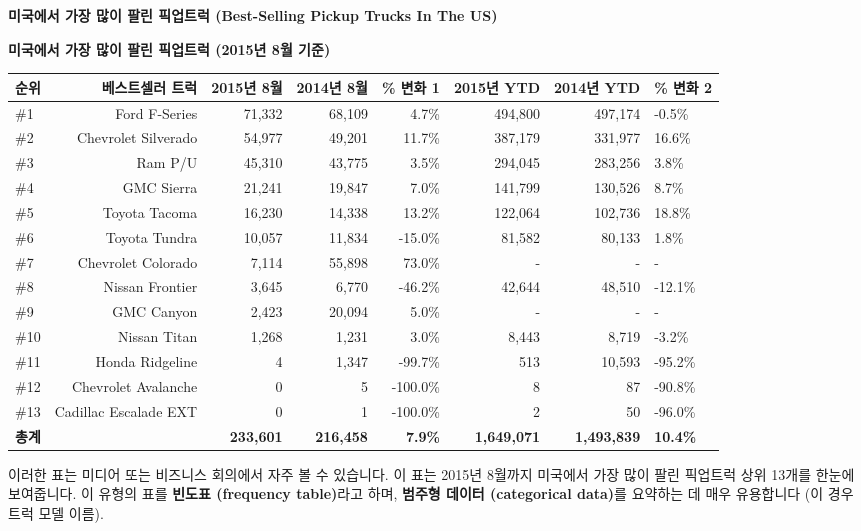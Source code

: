 \documentclass[11pt,a4paper]{book}
\providecommand{\captionof}[2]{\textbf{#2}}
\theoremstyle{definition}
\begin{document}
\begin{examplebox}
\textbf{미국에서 가장 많이 팔린 픽업트럭 (Best-Selling Pickup Trucks In The US)}

\begin{center}
\captionof{table}{미국에서 가장 많이 팔린 픽업트럭 (2015년 8월 기준)}
\label{tab:pickup_trucks}
\begin{adjustbox}{width=\textwidth, center}
\begin{tabular}{lrrrrrr}
\toprule
\textbf{순위} & \textbf{베스트셀러 트럭} & \textbf{2015년 8월} & \textbf{2014년 8월} & \textbf{\% 변화 1} & \textbf{2015년 YTD} & \textbf{2014년 YTD} & \textbf{\% 변화 2} \\
\midrule
\#1 & Ford F-Series & 71,332 & 68,109 & 4.7\% & 494,800 & 497,174 & -0.5\% \\
\#2 & Chevrolet Silverado & 54,977 & 49,201 & 11.7\% & 387,179 & 331,977 & 16.6\% \\
\#3 & Ram P/U & 45,310 & 43,775 & 3.5\% & 294,045 & 283,256 & 3.8\% \\
\#4 & GMC Sierra & 21,241 & 19,847 & 7.0\% & 141,799 & 130,526 & 8.7\% \\
\#5 & Toyota Tacoma & 16,230 & 14,338 & 13.2\% & 122,064 & 102,736 & 18.8\% \\
\#6 & Toyota Tundra & 10,057 & 11,834 & -15.0\% & 81,582 & 80,133 & 1.8\% \\
\#7 & Chevrolet Colorado & 7,114 & 55,898 & 73.0\% & - & - & - \\ %
\#8 & Nissan Frontier & 3,645 & 6,770 & -46.2\% & 42,644 & 48,510 & -12.1\% \\
\#9 & GMC Canyon & 2,423 & 20,094 & 5.0\% & - & - & - \\ %
\#10 & Nissan Titan & 1,268 & 1,231 & 3.0\% & 8,443 & 8,719 & -3.2\% \\
\#11 & Honda Ridgeline & 4 & 1,347 & -99.7\% & 513 & 10,593 & -95.2\% \\
\#12 & Chevrolet Avalanche & 0 & 5 & -100.0\% & 8 & 87 & -90.8\% \\
\#13 & Cadillac Escalade EXT & 0 & 1 & -100.0\% & 2 & 50 & -96.0\% \\
\midrule
\textbf{총계} & & \textbf{233,601} & \textbf{216,458} & \textbf{7.9\%} & \textbf{1,649,071} & \textbf{1,493,839} & \textbf{10.4\%} \\
\bottomrule
\end{tabular}
\end{adjustbox}
\end{center}
이러한 표는 미디어 또는 비즈니스 회의에서 자주 볼 수 있습니다. 이 표는 2015년 8월까지 미국에서 가장 많이 팔린 픽업트럭 상위 13개를 한눈에 보여줍니다. 이 유형의 표를 \textbf{빈도표 (frequency table)}라고 하며, \textbf{범주형 데이터 (categorical data)}를 요약하는 데 매우 유용합니다 (이 경우 트럭 모델 이름).


\end{examplebox}
\end{document}
